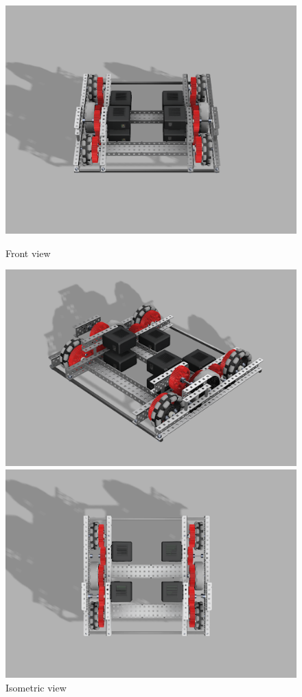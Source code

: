 \begin{figure}[hbt!] %
    \begin{minipage}{.5\textwidth}
        \centering
        \includegraphics[width=.8\linewidth]{images/Frontdown-V1-Drivetrain.png}
        \caption{Front view}
        \label{fig:frontdown}
    \end{minipage}
    \begin{minipage}{.5\textwidth}
        \centering
        \includegraphics[width=.8\linewidth]{images/Iso-V1-Drivetrain.png}
        \caption{Isometric view}
        \label{fig:iso}
    \end{minipage}
    \begin{minipage}{.5\textwidth}
        \centering
        \includegraphics[width=.8\linewidth]{images/Topdown-V1-Drivetrain.png}

\end{minipage}
\end{figure}
